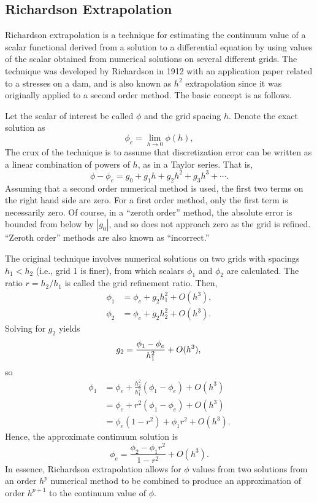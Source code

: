 \documentclass[ms,cpyr,lof,lot]{uathesis}
\begin{document}
\subsection{Richardson Extrapolation}
Richardson extrapolation is a technique for estimating the continuum value of a scalar functional derived from a solution to a differential equation by using values of the scalar obtained from numerical solutions on several different grids.
The technique was developed by Richardson in 1912 with an application paper related to a stresses on a dam, and is also known as $h^2$ extrapolation since it was originally applied to a second order method.
The basic concept is as follows.

Let the scalar of interest be called $\phi$ and the grid spacing $h$.
Denote the exact solution as
\begin{equation}
  \phi_e = \lim_{h \to 0} \phi(h),
\end{equation}
The crux of the technique is to assume that discretization error can be written as a linear combination of powers of $h$, as in a Taylor series.
That is,
\begin{equation}
  \phi - \phi_e = g_0 + g_1 h + g_2 h^2 + g_3 h^3 + \cdots.
\end{equation}
Assuming that a second order numerical method is used, the first two terms on the right hand side are zero.
For a first order method, only the first term is necessarily zero.
Of course, in a ``zeroth order'' method, the absolute error is bounded from below by $|g_0|$, and so does not approach zero as the grid is refined.
``Zeroth order'' methods are also known as ``incorrect.''

The original technique involves numerical solutions on two grids with spacings $h_1 < h_2$ (i.e., grid 1 is finer), from which scalars $\phi_1$ and $\phi_2$ are calculated.
The ratio $r = h_2/h_1$ is called the grid refinement ratio.
Then,
\begin{align*}
  \phi_1 &= \phi_e + g_2 h_1^2 + O(h^3), \\
  \phi_2 &= \phi_e + g_2 h_2^2 + O(h^3).
\end{align*}
Solving for $g_2$ yields
\begin{equation*}
  g_2 = \frac{\phi_1 - \phi_e}{h_1^2} + O(h^3), \\
\end{equation*}
so
\begin{align*}
  \phi_1 &= \phi_e + \frac{h_2^2}{h_1^2}(\phi_1 - \phi_e) + O(h^3) \\
  &=  \phi_e + r^2(\phi_1 - \phi_e) + O(h^3) \\
  &= \phi_e(1-r^2) + \phi_1 r^2 + O(h^3).
\end{align*}
Hence, the approximate continuum solution is
\begin{equation*}
  \phi_e = \frac{\phi_2 - \phi_1 r^2}{1 - r^2} + O(h^3).
\end{equation*}
In essence, Richardson extrapolation allows for $\phi$ values from two solutions from an order $h^p$ numerical method to be combined to produce an approximation of order $h^{p+1}$ to the continuum value of $\phi$.
\end{document}
